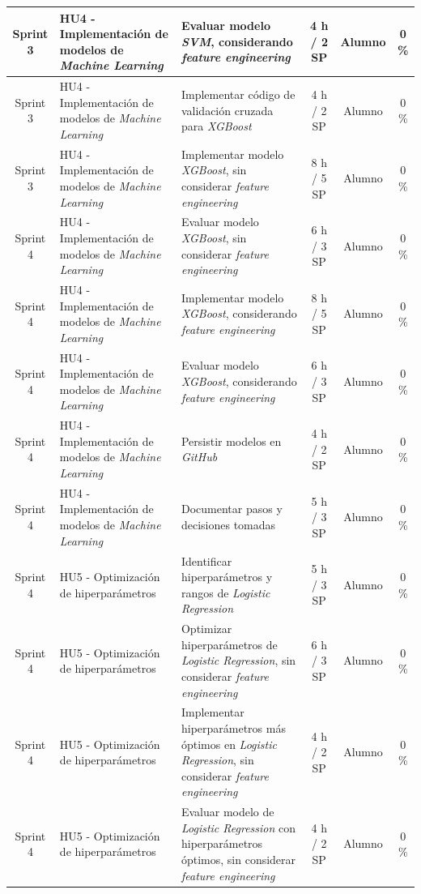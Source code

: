 \documentclass[
11pt, %
]{charter}
\begin{document}
\begin{xltabular}{\linewidth}{@{}|c|X|X|c|c|c|@{}}
Sprint 3 & HU4 - Implementación de modelos de \textit{Machine Learning} & Evaluar modelo \textit{SVM}, considerando \textit{feature engineering}  & 4 h / 2 SP & Alumno & 0 \%\\ \hline
Sprint 3 & HU4 - Implementación de modelos de \textit{Machine Learning} & Implementar código de validación cruzada para \textit{XGBoost}  & 4 h / 2 SP & Alumno & 0 \%\\ \hline
Sprint 3 & HU4 - Implementación de modelos de \textit{Machine Learning} & Implementar modelo \textit{XGBoost}, sin considerar \textit{feature engineering}  & 8 h / 5 SP & Alumno & 0 \%\\ \hline
Sprint 4 & HU4 - Implementación de modelos de \textit{Machine Learning} & Evaluar modelo \textit{XGBoost}, sin considerar \textit{feature engineering}  & 6 h / 3 SP & Alumno & 0 \%\\ \hline
Sprint 4 & HU4 - Implementación de modelos de \textit{Machine Learning} & Implementar modelo \textit{XGBoost}, considerando \textit{feature engineering}  & 8 h / 5 SP & Alumno & 0 \%\\ \hline
Sprint 4 & HU4 - Implementación de modelos de \textit{Machine Learning} & Evaluar modelo \textit{XGBoost}, considerando \textit{feature engineering}  & 6 h / 3 SP & Alumno & 0 \%\\ \hline
Sprint 4 & HU4 - Implementación de modelos de \textit{Machine Learning} & Persistir modelos en \textit{GitHub}  & 4 h / 2 SP & Alumno & 0 \%\\ \hline
Sprint 4 & HU4 - Implementación de modelos de \textit{Machine Learning} & Documentar pasos y decisiones tomadas  & 5 h / 3 SP & Alumno & 0 \%\\ \hline
Sprint 4 & HU5 - Optimización de hiperparámetros & Identificar hiperparámetros y rangos de \textit{Logistic Regression}  & 5 h / 3 SP & Alumno & 0 \%\\ \hline
Sprint 4 & HU5 - Optimización de hiperparámetros & Optimizar hiperparámetros de \textit{Logistic Regression}, sin considerar \textit{feature engineering}  & 6 h / 3 SP & Alumno & 0 \% \\ \hline
Sprint 4 & HU5 - Optimización de hiperparámetros & Implementar hiperparámetros más óptimos en \textit{Logistic Regression}, sin considerar \textit{feature engineering} & 4 h / 2 SP & Alumno & 0 \% \\ \hline
Sprint 4 & HU5 - Optimización de hiperparámetros & Evaluar modelo de \textit{Logistic Regression} con hiperparámetros óptimos, sin considerar \textit{feature engineering}  & 4 h / 2 SP & Alumno & 0 \% \\ \hline

\end{xltabular}
\end{document}
